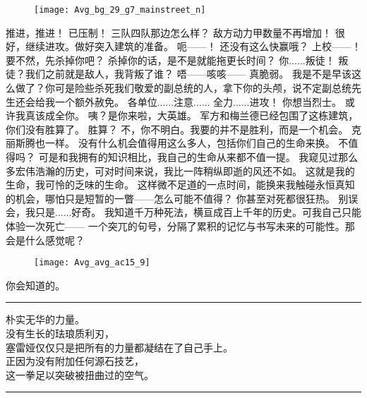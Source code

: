 \documentclass[openany]{book}
\begin{document}
\begin{figure}[h]
    \centering
    \texttt{[image: Avg\_bg\_29\_g7\_mainstreet\_n]}
\end{figure}
\begin{dialogue}
     推进，推进！
     已压制！
     三队四队那边怎么样？
     敌方动力甲数量不再增加！
     很好，继续进攻。做好突入建筑的准备。
     呃——！
     还没有这么快赢哦？
     上校——！
     要不然，先杀掉你吧？
     杀掉你的话，是不是就能拖更长时间？
     你......叛徒！
     叛徒？我们之前就是敌人，我背叛了谁？
     唔——咳咳——
     真脆弱。
     我是不是早该这么做了？你可是险些杀死我们敬爱的副总统的人，拿下你的头颅，说不定副总统先生还会给我一个额外赦免。
     各单位......注意......
     全力......进攻！
     你想当烈士。
     或许我真该成全你。
     咦？是你来啦，大英雄。
     军方和梅兰德已经包围了这栋建筑，你们没有胜算了。
     胜算？
     不，你不明白。我要的并不是胜利，而是一个机会。
     克丽斯腾也一样。
     没有什么机会值得用这么多人，包括你们自己的生命来换。
     不值得吗？
     可是和我拥有的知识相比，我自己的生命从来都不值一提。
     我窥见过那么多宏伟浩瀚的历史，可对时间来说，我比一阵稍纵即逝的风还不如。
     这就是我的生命，我可怜的乏味的生命。
     这样微不足道的一点时间，能换来我触碰永恒真知的机会，哪怕只是短暂的一瞥——怎么可能不值得？
     你甚至对死都很狂热。
     别误会，我只是......好奇。
     我知道千万种死法，横亘成百上千年的历史。可我自己只能体验一次死亡——
     一个突兀的句号，分隔了累积的记忆与书写未来的可能性。那会是什么感觉呢？
    \begin{figure}[h]
        \centering
        \texttt{[image: Avg\_avg\_ac15\_9]}
    \end{figure}
     你会知道的。
    \par\noindent\rule{\textwidth}{0.4pt}\par
    朴实无华的力量。\\
    没有生长的珐琅质利刃，\\
    塞雷娅仅仅只是把所有的力量都凝结在了自己手上。\\
    正因为没有附加任何源石技艺，\\
    这一拳足以突破被扭曲过的空气。
    \par\noindent\rule{\textwidth}{0.4pt}
\end{dialogue}
\end{document}
